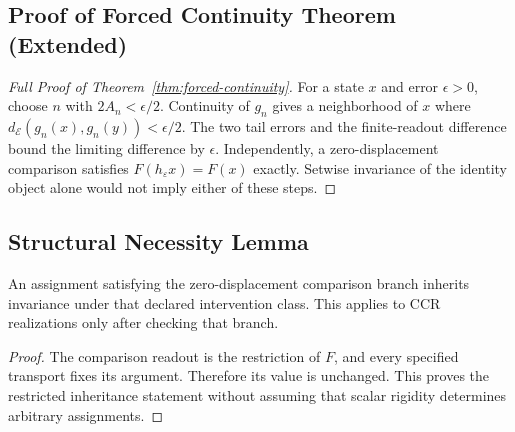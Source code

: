\subsection{Proof of Forced Continuity Theorem (Extended)}

\begin{proof}[Full Proof of Theorem~\ref{thm:forced-continuity}]
For a state $x$ and error $\epsilon>0$, choose $n$ with $2A_n<\epsilon/2$. Continuity of $g_n$ gives a neighborhood of $x$ where $d_{\mathcal E}(g_n(x),g_n(y))<\epsilon/2$. The two tail errors and the finite-readout difference bound the limiting difference by $\epsilon$. Independently, a zero-displacement comparison satisfies $F(h_\varepsilon x)=F(x)$ exactly. Setwise invariance of the identity object alone would not imply either of these steps.
\end{proof}

\subsection{Structural Necessity Lemma}

\begin{lemma}
An assignment satisfying the zero-displacement comparison branch inherits invariance under that declared intervention class. This applies to CCR realizations only after checking that branch.
\end{lemma}

\begin{proof}
The comparison readout is the restriction of $F$, and every specified transport fixes its argument. Therefore its value is unchanged. This proves the restricted inheritance statement without assuming that scalar rigidity determines arbitrary assignments.
\end{proof}


